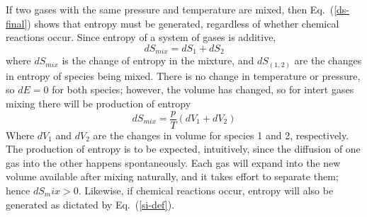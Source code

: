 \documentclass[a4paper]{report}
\newcommand{\eref}[1]{Eq.~(\ref{#1})}
\begin{document}
\begin{enumerate}
    If two gases with the same pressure and temperature are mixed, then
    \eref{ds-final} shows that entropy must be generated, regardless of whether
    chemical reactions occur.  Since entropy of a system of gases is additive,
    \begin{equation}
      dS_{mix} = dS_1 + dS_2
      \label{s-additive}
    \end{equation}
    where $dS_{mix}$ is the change of entropy in the mixture, and $dS_{(1,2)}$
    are the changes in entropy of species being mixed.  There is no change in
    temperature or pressure, so $dE = 0$ for both species; however, the volume
    has changed, so for intert gases mixing there will be production of entropy
    \begin{equation}
      dS_{mix} = \frac{p}{T}\left( dV_1 + dV_2 \right)
      \label{smix-change}
    \end{equation}
    Where $dV_1$ and $dV_2$ are the changes in volume for species 1 and 2,
    respectively.  The production of entropy is to be expected, intuitively,
    since the diffusion of one gas into the other happens spontaneously.  Each
    gas will expand into the new volume available after mixing naturally, and it
    takes effort to separate them; hence $dS_mix > 0$.  Likewise, if chemical
    reactions occur, entropy will also be generated as dictated by
    \eref{si-def}.

\end{enumerate}
\end{document}
